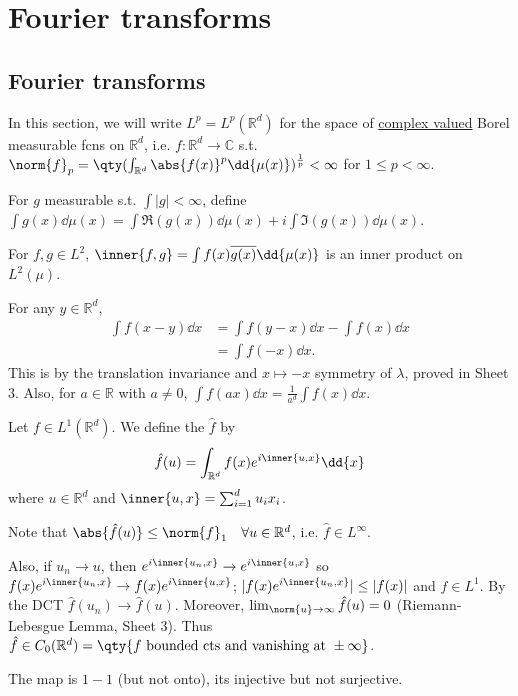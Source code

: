 \section{Fourier transforms}
\subsection{Fourier transforms}
In this section, we will write $L^p = L^p(\mathbb R^d)$ for the space of \underline{complex valued} Borel measurable fcns on $\mathbb{R}^d$, i.e. $f \colon \mathbb R^d \to \mathbb C$ s.t. $\norm{f}_p = \qty(\int_{\mathbb R^d} \abs{f(x)}^p \dd{\mu(x)})^{\frac 1p} < \infty$ for $1 \leq p < \infty$.

\begin{remark}
	For $g$ measurable s.t. $\int |g| < \infty$, define $\int g(x) \dd{\mu(x)} = \int \Re(g(x)) \dd{\mu(x)} + i \int \Im(g(x)) \dd{\mu(x)}$.

\end{remark}

For $f, g \in L^2$, $\inner{f, g} = \int f(x) \overline{g(x)} \dd{\mu(x)}$ is an inner product on $L^2(\mu)$.

For any $y \in \mathbb{R}^d$,
\begin{align*}
	\int f(x - y) \dd{x} &= \int f(y - x) \dd{x} - \int f(x) \dd{x} \\
	&= \int f(-x) \dd{x}.
\end{align*}
This is by the translation invariance and $x \mapsto -x$ symmetry of $\lambda$, proved in Sheet 3.
Also, for $a \in \mathbb{R}$ with $a \neq 0$, $\int f(ax) \dd{x} = \frac{1}{a^d} \int f(x) \dd{x}$.

\begin{definition}
	Let $f \in L^1(\mathbb R^d)$.
	We define the  $\hat f$ by
	\[ \hat f(u) = \int_{\mathbb R^d} f(x) e^{i\inner{u,x}} \dd{x} \]
	where $u \in \mathbb{R}^d$ and $\inner{u,x} = \sum_{i=1}^d u_i x_i$.
\end{definition}

\begin{remark}
	Note that $\abs{\hat f(u)} \leq \norm{f}_1 \quad \forall u \in \mathbb{R}^d$, i.e. $\hat{f} \in L^\infty$.

	Also, if $u_n \to u$, then $e^{i\inner{u_n,x}} \to e^{i\inner{u,x}}$ so $f(x) e^{i\inner{u_n,x}} \to f(x) e^{i\inner{u,x}}$; $|f(x) e^{i\inner{u_n,x}}| \leq |f(x)|$ and $f \in L^1$.
	By the DCT $\hat f(u_n) \to \hat f(u)$.
	Moreover, $\lim_{\norm{u} \to \infty} \hat{f}(u) = 0$ (Riemann-Lebesgue Lemma, Sheet 3).
	Thus $\hat f \in C_0(\mathbb{R}^d) = \qty{f \text{ bounded cts and vanishing at } \pm \infty}$.

	The map is $1 - 1$ (but not onto), its injective but not surjective.
\end{remark}

